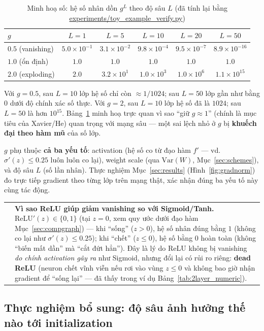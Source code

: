 \documentclass[12pt,a4paper]{report}
\makeatletter
\newenvironment{tructiep}[1][Cách hiểu đơn giản]
  {\par\smallskip\noindent\begin{tabular}{@{}p{0.35em}@{\hspace{6pt}}p{\dimexpr\linewidth-1.9em\relax}@{}}
   \textcolor{boxln}{\rule{2pt}{\baselineskip}} & \textbf{#1.}\enspace\ignorespaces}
  {\end{tabular}\par\smallskip}
\makeatother
\begin{document}
\begin{table}[htbp]
\centering
\caption{Minh hoạ số: hệ số nhân dồn $g^L$ theo độ sâu $L$ (đã tính lại
bằng \url{experiments/toy_example_verify.py})}
\begin{tabular}{@{}lccccc@{}}
\toprule
$g$ & $L=1$ & $L=5$ & $L=10$ & $L=20$ & $L=50$ \\
\midrule
$0.5$ (vanishing) & $5.0\times10^{-1}$ & $3.1\times10^{-2}$ & $9.8\times10^{-4}$ & $9.5\times10^{-7}$ & $8.9\times10^{-16}$ \\
$1.0$ (ổn định) & $1.0$ & $1.0$ & $1.0$ & $1.0$ & $1.0$ \\
$2.0$ (exploding) & $2.0$ & $3.2\times10^{1}$ & $1.0\times10^{3}$ & $1.0\times10^{6}$ & $1.1\times10^{15}$ \\
\bottomrule
\end{tabular}
\label{tab:ge_numeric}
\end{table}

Với $g=0.5$, sau $L=10$ lớp hệ số chỉ còn $\approx1/1024$; sau $L=50$ lớp
gần như bằng $0$ dưới độ chính xác số thực. Với $g=2$, sau $L=10$ lớp hệ số
đã là $1024$; sau $L=50$ là hơn $10^{15}$. Bảng~\ref{tab:ge_numeric} minh
hoạ trực quan vì sao ``giữ $g\approx1$'' (chính là mục tiêu của Xavier/He)
quan trọng với mạng sâu --- một sai lệch nhỏ ở $g$ bị \textbf{khuếch đại
theo hàm mũ} của số lớp.

$g$ phụ thuộc \textbf{cả ba yếu tố}: activation (hệ số co từ đạo hàm $f'$
--- vd. $\sigma'(z)\le0.25$ luôn luôn co lại), weight scale (qua
$\mathrm{Var}(W)$, Mục~\ref{sec:schemes}), và độ sâu $L$ (số lần nhân).
Thực nghiệm Mục~\ref{sec:results} (Hình~\ref{fig:gradnorm}) đo trực tiếp
gradient theo từng lớp trên mạng thật, xác nhận đúng ba yếu tố này cùng
tác động.

\begin{tructiep}[Vì sao ReLU giúp giảm vanishing so với Sigmoid/Tanh]
$\mathrm{ReLU}'(z)\in\{0,1\}$ (tại $z=0$, xem quy ước dưới đạo hàm
Mục~\ref{sec:compgraph}) --- khi ``sống'' ($z>0$), hệ số nhân đúng bằng
$1$ (không co lại như $\sigma'(z)\le0.25$); khi ``chết'' ($z\le0$), hệ số
bằng $0$ hoàn toàn (không ``biến mất dần'' mà ``cắt đứt hẳn''). Đây là lý do
ReLU không bị vanishing \emph{do chính activation gây ra} như Sigmoid,
nhưng đổi lại có rủi ro riêng: \textbf{dead ReLU} (neuron chết vĩnh viễn
nếu rơi vào vùng $z\le0$ và không bao giờ nhận gradient để ``sống lại''
--- đã thấy trong ví dụ Bảng~\ref{tab:2layer_numeric}).
\end{tructiep}

\subsection{Thực nghiệm bổ sung: độ sâu ảnh hưởng thế nào tới initialization}
\label{sec:depthexp}
\end{document}

